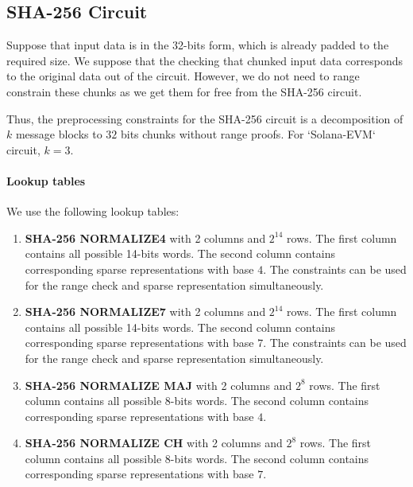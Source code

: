 \subsection{SHA-256 Circuit}
\label{section:sha256}
Suppose that input data is in the 32-bits form, which is already padded to the required size.
We suppose that the checking that chunked input data corresponds to the original data out of the circuit.
However, we do not need to range constrain these chunks as we get them for free from the SHA-256 circuit.


Thus, the preprocessing constraints for the SHA-256 circuit is a decomposition of $k$ message blocks to $32$ bits chunks without range proofs. For `Solana-EVM` circuit, $k = 3$.

\paragraph{Lookup tables}
We use the following lookup tables:
\begin{enumerate}
\item \textbf{SHA-256 NORMALIZE4} with 2 columns and $2^{14}$ rows. 
The first column contains all possible 14-bits words.
The second column contains corresponding sparse representations with base $4$.
The constraints can be used for the range check and sparse representation simultaneously.
\item \textbf{SHA-256 NORMALIZE7} with 2 columns and $2^{14}$ rows. 
The first column contains all possible 14-bits words.
The second column contains corresponding sparse representations with base $7$.
The constraints can be used for the range check and sparse representation simultaneously.
\item \textbf{SHA-256 NORMALIZE MAJ} with 2 columns and $2^{8}$ rows. 
The first column contains all possible 8-bits words.
The second column contains corresponding sparse representations with base $4$.
\item \textbf{SHA-256 NORMALIZE CH} with 2 columns and $2^{8}$ rows. 
The first column contains all possible 8-bits words.
The second column contains corresponding sparse representations with base $7$.
\end{enumerate}

